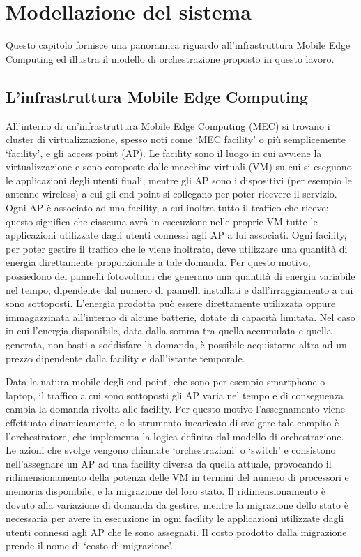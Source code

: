 \chapter{Modellazione del sistema}
\label{cap:modellazione-sistema}

Questo capitolo fornisce una panoramica riguardo all'infrastruttura Mobile Edge Computing ed illustra il modello di orchestrazione proposto in questo lavoro.


%
%
\section{L'infrastruttura Mobile Edge Computing}
\label{sec:infrastruttura-mec}

All'interno di un'infrastruttura Mobile Edge Computing (MEC) si trovano i cluster di virtualizzazione, spesso noti come `MEC facility' o più semplicemente `facility', e gli access point (AP). Le facility sono il luogo in cui avviene la virtualizzazione e sono composte dalle macchine virtuali (VM) su cui si eseguono le applicazioni degli utenti finali, mentre gli AP sono i dispositivi (per esempio le antenne wireless) a cui gli end point si collegano per poter ricevere il servizio. Ogni AP è associato ad una facility, a cui inoltra tutto il traffico che riceve: questo significa che ciascuna avrà in esecuzione nelle proprie VM tutte le applicazioni utilizzate dagli utenti connessi agli AP a lui associati. Ogni facility, per poter gestire il traffico che le viene inoltrato, deve utilizzare una quantità di energia direttamente proporzionale a tale domanda. Per questo motivo, possiedono dei pannelli fotovoltaici che generano una quantità di energia variabile nel tempo, dipendente dal numero di pannelli installati e dall'irraggiamento a cui sono sottoposti. L'energia prodotta può essere direttamente utilizzata oppure immagazzinata all'interno di alcune batterie, dotate di capacità limitata. Nel caso in cui l'energia disponibile, data dalla somma tra quella accumulata e quella generata, non basti a soddisfare la domanda, è possibile acquistarne altra ad un prezzo dipendente dalla facility e dall'istante temporale.

Data la natura mobile degli end point, che sono per esempio smartphone o laptop, il traffico a cui sono sottoposti gli AP varia nel tempo e di conseguenza cambia la domanda rivolta alle facility. Per questo motivo l'assegnamento viene effettuato dinamicamente, e lo strumento incaricato di svolgere tale compito è l'orchestratore, che implementa la logica definita dal modello di orchestrazione. Le azioni che svolge vengono chiamate `orchestrazioni' o `switch' e consistono nell'assegnare un AP ad una facility diversa da quella attuale, provocando il ridimensionamento della potenza delle VM in termini del numero di processori e memoria disponibile, e la migrazione del loro stato. Il ridimensionamento è dovuto alla variazione di domanda da gestire, mentre la migrazione dello stato è necessaria per avere in esecuzione in ogni facility le applicazioni utilizzate dagli utenti connessi agli AP che le sono assegnati. Il costo prodotto dalla migrazione prende il nome di `costo di migrazione'.

